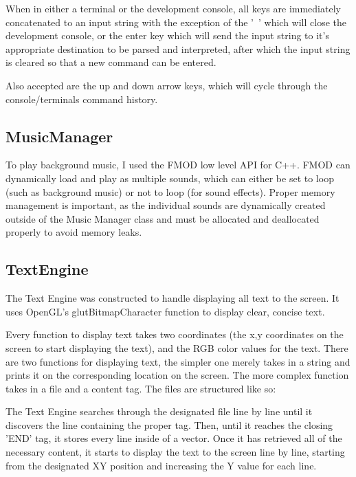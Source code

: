 \documentclass{article}
\begin{document}
When in either a terminal or the development console, all keys are immediately concatenated to an input string with the exception of the '~' which will close the development console, or the enter key which will send the input string to it's appropriate destination to be parsed and interpreted, after which the input string is cleared so that a new command can be entered.

Also accepted are the up and down arrow keys, which will cycle through the console/terminals command history.

\subsection{MusicManager}
To play background music, I used the FMOD low level API for C++. FMOD can dynamically load and play as multiple sounds, which can either be set to loop (such as background music) or not to loop (for sound effects). Proper memory management is important, as the individual sounds are dynamically created outside of the Music Manager class and must be allocated and deallocated properly to avoid memory leaks.

\subsection{TextEngine}
The Text Engine was constructed to handle displaying all text to the screen. It uses OpenGL's glutBitmapCharacter function to display clear, concise text.

Every function to display text takes two coordinates (the x,y coordinates on the screen to start displaying the text), and the RGB color values for the text. There are two functions for displaying text, the simpler one merely takes in a string and prints it on the corresponding location on the screen. The more complex function takes in a file and a content tag. The files are structured like so:



The Text Engine searches through the designated file line by line until it discovers the line containing the proper tag. Then, until it reaches the closing 'END' tag, it stores every line inside of a vector. Once it has retrieved all of the necessary content, it starts to display the text to the screen line by line, starting from the designated XY position and increasing the Y value for each line.
\end{document}
